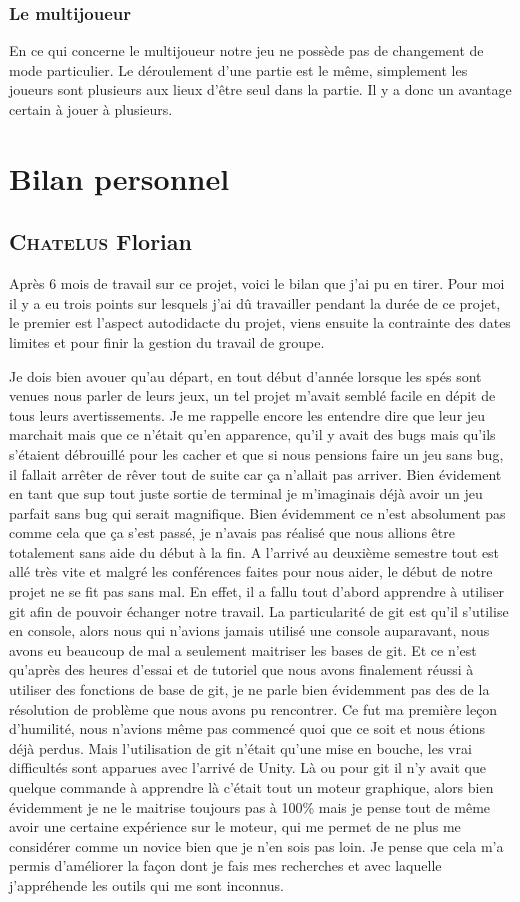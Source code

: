 \documentclass[a4paper, 12pt]{article}
\begin{document}
			\subsubsection{Le multijoueur}
			En ce qui concerne le multijoueur notre jeu ne possède pas de changement de mode particulier. Le déroulement d’une partie est le même, simplement les joueurs sont plusieurs aux lieux d’être seul dans la partie. Il y a donc un avantage certain à jouer à plusieurs.
				
			
\section{Bilan personnel}
	\subsection{\textsc{Chatelus} Florian}
	Après 6 mois de travail sur ce projet, voici le bilan que j’ai pu en tirer. Pour moi il y a eu trois points sur lesquels j’ai dû travailler pendant la durée de ce projet, le premier est l’aspect autodidacte du projet, viens ensuite la contrainte des dates limites et pour finir la gestion du travail de groupe.
		\medbreak
\par Je dois bien avouer qu’au départ, en tout début d’année lorsque les spés sont venues nous parler de leurs jeux, un tel projet m’avait semblé facile en dépit de tous leurs avertissements. Je me rappelle encore les entendre dire que leur jeu marchait mais que ce n’était qu’en apparence, qu’il y avait des bugs mais qu’ils s’étaient débrouillé pour les cacher et que si nous pensions faire un jeu sans bug, il fallait arrêter de rêver tout de suite car ça n’allait pas arriver. Bien évidement en tant que sup tout juste sortie de terminal je m’imaginais déjà avoir un jeu parfait sans bug qui serait magnifique. Bien évidemment ce n’est absolument pas comme cela que ça s’est passé, je n’avais pas réalisé que nous allions être totalement sans aide du début à la fin. A l’arrivé au deuxième semestre tout est allé très vite et malgré les conférences faites pour nous aider, le début de notre projet ne se fit pas sans mal. En effet, il a fallu tout d’abord apprendre à utiliser git afin de pouvoir échanger notre travail. La particularité de git est qu’il s’utilise en console, alors nous qui n’avions jamais utilisé une console auparavant, nous avons eu beaucoup de mal a seulement maitriser les bases de git. Et ce n’est qu’après des heures d’essai et de tutoriel que nous avons finalement réussi à utiliser des fonctions de base de git, je ne parle bien évidemment pas des de la résolution de problème que nous avons pu rencontrer. Ce fut ma première leçon d’humilité, nous n’avions même pas commencé quoi que ce soit et nous étions déjà perdus. Mais l’utilisation de git n’était qu’une mise en bouche, les vrai difficultés sont apparues avec l’arrivé de Unity. Là ou pour git il n’y avait que quelque commande à apprendre là c’était tout un moteur graphique, alors bien évidemment je ne le maitrise toujours pas à 100\%  mais je pense tout de même avoir une certaine expérience sur le moteur, qui me permet de ne plus me considérer comme un novice bien que je n’en sois pas loin. Je pense que cela m’a permis d’améliorer la façon dont je fais mes recherches et avec laquelle j’appréhende les outils qui me sont inconnus.
\end{document}
